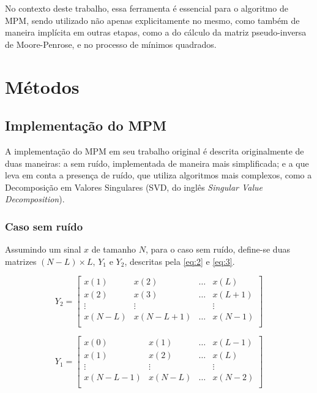 \documentclass[12pt]{article}
\begin{document}
No contexto deste trabalho, essa ferramenta é essencial para o algoritmo de MPM, sendo utilizado não apenas explicitamente no mesmo, como também de maneira implícita em outras etapas, como a do 
cálculo da matriz pseudo-inversa de Moore-Penrose, e no processo de mínimos quadrados.

\section{Métodos}

\subsection{Implementação do MPM} \label{sec:implement-mpm}

A implementação do MPM em seu trabalho original é descrita originalmente de duas maneiras: a sem ruído, 
implementada de maneira mais simplificada; e a que leva em conta a presença de ruído, que utiliza algoritmos mais complexos, como a
Decomposição em Valores Singulares (SVD, do inglês \textit{Singular Value Decomposition}).

\subsubsection{Caso sem ruído}
Assumindo um sinal $x$ de tamanho $N$, para o caso sem ruído, define-se duas matrizes $(N-L) \times L$, $Y_1$ e $Y_2$, descritas pela \autoref{eq:2} e \autoref{eq:3}.

\begin{equation} \label{eq:2}
    Y_2 = \begin{bmatrix} x(1) & x(2) & \dots & x(L) \\
                            x(2) & x(3) & \dots & x(L + 1) \\
                            \vdots & \vdots & & \vdots \\
                            x(N-L) & x(N - L + 1) & \dots & x(N-1) \\
    \end{bmatrix}
\end{equation}

\begin{equation} \label{eq:3}
    Y_1 = \begin{bmatrix} x(0) & x(1) & \dots & x(L-1) \\
                            x(1) & x(2) & \dots & x(L) \\
                            \vdots & \vdots & & \vdots \\
                            x(N - L - 1) & x(N - L) & \dots & x(N-2) \\
    \end{bmatrix}
\end{equation}
\end{document}
